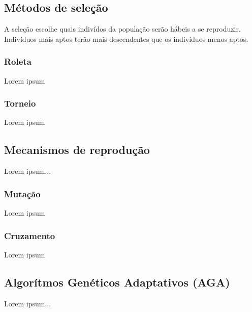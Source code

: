 \subsection{Métodos de seleção}
A seleção escolhe quais indivídos da população serão hábeis a se reproduzir. Indivíduos mais aptos terão mais descendentes que os indivíduos menos aptos.

    \subsubsection{Roleta}
    Lorem ipsum

    \subsubsection{Torneio}
    Lorem ipsum

\subsection{Mecanismos de reprodução}
Lorem ipsum...

    \subsubsection{Mutação}
    Lorem ipsum

    \subsubsection{Cruzamento}
    Lorem ipsum

\subsection{Algorítmos Genéticos Adaptativos (AGA)}
Lorem ipsum...